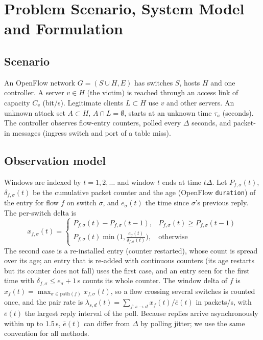 \documentclass[conference]{IEEEtran}
\begin{document}
\section{Problem Scenario, System Model and Formulation}\label{sec:model}
\subsection{Scenario}
An OpenFlow network $G=(S\cup H,E)$ has switches $S$, hosts $H$ and one controller. A server $v\in H$ (the victim) is reached through an access link of capacity $C_v$ (bit/s). Legitimate clients $L\subset H$ use $v$ and other servers. An unknown attack set $A\subset H$, $A\cap L=\emptyset$, starts at an unknown time $\tau_a$ (seconds). The controller observes flow-entry counters, polled every $\Delta$ seconds, and packet-in messages (ingress switch and port of a table miss).

\subsection{Observation model}
Windows are indexed by $t=1,2,\dots$ and window $t$ ends at time $t\Delta$. Let $P_{f,\sigma}(t)$, $\delta_{f,\sigma}(t)$ be the cumulative packet counter and the age (OpenFlow \texttt{duration}) of the entry for flow $f$ on switch $\sigma$, and $e_\sigma(t)$ the time since $\sigma$'s previous reply. The per-switch delta is
\begin{equation}
x_{f,\sigma}(t)=\begin{cases}
P_{f,\sigma}(t)-P_{f,\sigma}(t-1), & P_{f,\sigma}(t)\ge P_{f,\sigma}(t-1)\\
P_{f,\sigma}(t)\min\!\big(1,\tfrac{e_\sigma(t)}{\delta_{f,\sigma}(t)}\big), & \text{otherwise}
\end{cases}\label{eq:delta}
\end{equation}
The second case is a re-installed entry (counter restarted), whose count is spread over its age; an entry that is re-added with continuous counters (its age restarts but its counter does not fall) uses the first case, and an entry seen for the first time with $\delta_{f,\sigma}\le e_\sigma+1$\,s counts its whole counter. The window delta of $f$ is $x_f(t)=\max_{\sigma\in\text{path}(f)}x_{f,\sigma}(t)$, so a flow crossing several switches is counted once, and the pair rate is $\lambda_{s,d}(t)=\sum_{f:s\to d}x_f(t)/\bar e(t)$ in packets/s, with $\bar e(t)$ the largest reply interval of the poll. Because replies arrive asynchronously within up to 1.5\,s, $\bar e(t)$ can differ from $\Delta$ by polling jitter; we use the same convention for all methods.
\end{document}

